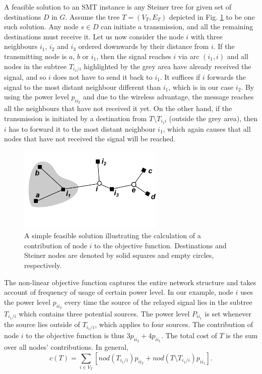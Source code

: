 A feasible solution to an SMT instance is any Steiner tree for given set of destinations $D$ in $G$. Assume the tree $T=(V_T, E_T)$ depicted in Fig. \ref{fig:objexp} to be one such solution. Any node $s\in D$ can initiate a transmission, and all the remaining destinations must receive it. Let us now consider the node $i$ with three neighbours $i_1$, $i_2$ and $i_3$ ordered downwards by their distance from $i$. If the transmitting node is $a$, $b$ or $i_1$, then the signal reaches $i$ via arc $(i_1,i)$ and all nodes in the subtree $T_{i_1/i}$ highlighted by the grey area have already received the signal, and so $i$ does not have to send it back to $i_1$. It suffices if $i$ forwards the signal to the most distant neighbour different than $i_1$, which is in our case $i_2$. By using the power level $p_{ii_2}$ and due to the wireless advantage, the message reaches all the neighbours that have not received it yet. On the other hand, if the transmission is initiated by a destination from $T\setminus T_{i_1i}$ (outside the grey area), then $i$ has to forward it to the most distant neighbour $i_1$, which again causes that all nodes that have not received the signal will be reached.
\begin{figure}[h!]
        \centering
        \includegraphics[height=1.6in]{objexp}
        \caption{A simple feasible solution illustrating the calculation of a contribution of node $i$ to the objective function. Destinations and Steiner nodes are denoted by solid squares and empty circles, respectively.}
                \label{fig:objexp}
\end{figure}

 The non-linear objective function captures the entire network structure and takes account of frequency of usage of certain power level. In our example, node $i$ uses the power level $p_{ii_2}$ every time the source of the relayed signal lies in the subtree $T_{i_1/i}$ which contains three potential sources. The power level $P_{ii_1}$ is set whenever the source lies outside of $T_{i_1/i}$, which applies to four sources. The contribution of node $i$ to the objective function is thus $3p_{ii_2} + 4p_{ii_1}$. The total cost of $T$ is the sum over all nodes' contributions. In general,
$$
c(T) = \sum\limits_{i\in V_T}\left[nod(T_{i_1/i})p_{ii_2} + nod(T\setminus T_{i_1/i})p_{ii_1}\right].
$$ 

